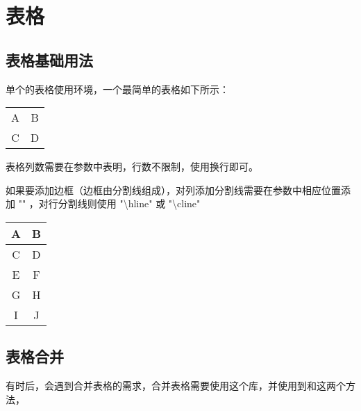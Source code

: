 \section{表格}\label{sec:table}
    \subsection{表格基础用法}
    
    单个的表格使用环境，一个最简单的表格如下所示：

    \begin{texshow}
        \begin{tabular}{cc} %
            A&B\\ %
            C&D\\
        \end{tabular}
    \end{texshow}

    表格列数需要在参数中表明，行数不限制，使用\highunderline{ \textbackslash{}\textbackslash{} }换行即可。
    
    如果要添加边框（边框由分割线组成），对列添加分割线需要在参数中相应位置添加 "\textbar" ，对行分割线则使用 "\textbackslash{}hline" 或 "\textbackslash{}cline"
    \begin{texshow}
        \begin{tabular}{|cc||} %
            A&B\\\hline
            C&D\\\cline{0-1} %
            E&F\\\cline{0-0}
            G&H\\\cline{1-1} %
            I&J\\\cline{0-0}\cline{1-1}
        \end{tabular}
    \end{texshow}
    
    \subsection{表格合并}

    有时后，会遇到合并表格的需求，合并表格需要使用这个库，并使用到和这两个方法，
    
